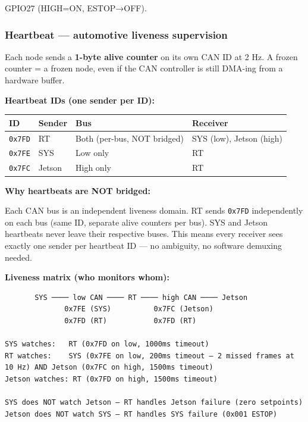 GPIO27 (HIGH=ON, ESTOP→OFF).

\subsubsection{Heartbeat --- automotive liveness
supervision}\label{heartbeat-automotive-liveness-supervision}

Each node sends a \textbf{1-byte alive counter} on its own CAN ID at 2 Hz. A
frozen counter = a frozen node, even if the CAN controller is still DMA-ing from
a hardware buffer.

\textbf{Heartbeat IDs (one sender per ID):}

\begin{longtable}[]{@{}llll@{}}
\toprule\noalign{}
ID & Sender & Bus & Receiver \\
\midrule\noalign{}
\endhead
\bottomrule\noalign{}
\endlastfoot
\texttt{0x7FD} & RT & Both (per-bus, NOT bridged) & SYS (low), Jetson (high) \\
\texttt{0x7FE} & SYS & Low only & RT \\
\texttt{0x7FC} & Jetson & High only & RT \\
\end{longtable}

\textbf{Why heartbeats are NOT bridged:}

Each CAN bus is an independent liveness domain. RT sends \texttt{0x7FD}
independently on each bus (same ID, separate alive counters per bus). SYS and
Jetson heartbeats never leave their respective buses. This means every receiver
sees exactly one sender per heartbeat ID --- no ambiguity, no software demuxing
needed.

\textbf{Liveness matrix (who monitors whom):}

\begin{verbatim}
       SYS ──── low CAN ──── RT ──── high CAN ──── Jetson
              0x7FE (SYS)          0x7FC (Jetson)
              0x7FD (RT)           0x7FD (RT)

SYS watches:   RT (0x7FD on low, 1000ms timeout)
RT watches:    SYS (0x7FE on low, 200ms timeout — 2 missed frames at 10 Hz) AND Jetson (0x7FC on high, 1500ms timeout)
Jetson watches: RT (0x7FD on high, 1500ms timeout)

SYS does NOT watch Jetson — RT handles Jetson failure (zero setpoints)
Jetson does NOT watch SYS — RT handles SYS failure (0x001 ESTOP)
\end{verbatim}

